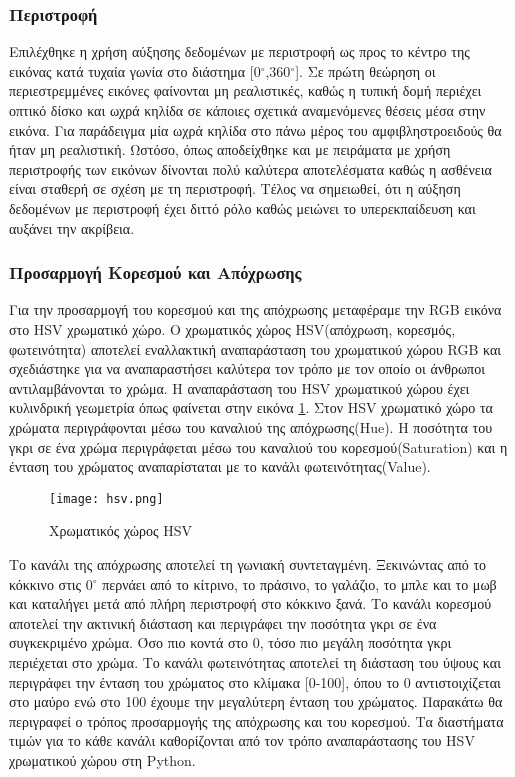 \subsubsection{Περιστροφή}
\label{subsubsec:5.1.2.1}


Επιλέχθηκε η χρήση αύξησης δεδομένων με περιστροφή ως προς το κέντρο της εικόνας κατά τυχαία γωνία στο διάστημα [0$^\circ$,360$^\circ$]. Σε πρώτη θεώρηση οι περιεστρεμμένες εικόνες φαίνονται μη ρεαλιστικές, καθώς η τυπική δομή περιέχει οπτικό δίσκο και ωχρά κηλίδα σε κάποιες σχετικά αναμενόμενες θέσεις  μέσα στην εικόνα. Για παράδειγμα μία ωχρά κηλίδα στο πάνω μέρος του αμφιβληστροειδούς θα ήταν μη ρεαλιστική. Ωστόσο, όπως αποδείχθηκε και με πειράματα με χρήση περιστροφής των εικόνων  δίνονται πολύ καλύτερα αποτελέσματα καθώς η ασθένεια είναι σταθερή σε σχέση με τη περιστροφή. Τέλος να σημειωθεί, ότι η αύξηση δεδομένων με περιστροφή έχει διττό ρόλο καθώς μειώνει το υπερεκπαίδευση και αυξάνει την ακρίβεια.



\subsubsection{Προσαρμογή Κορεσμού και Απόχρωσης}
\label{subsubsec:5.1.2.2}

Για την προσαρμογή του κορεσμού και της απόχρωσης μεταφέραμε την RGB εικόνα στο HSV χρωματικό χώρο\cite{HSV}. Ο χρωματικός χώρος HSV(απόχρωση, κορεσμός, φωτεινότητα) αποτελεί εναλλακτική αναπαράσταση του χρωματικού χώρου RGB και σχεδιάστηκε για να αναπαραστήσει καλύτερα  τον τρόπο με τον  οποίο οι άνθρωποι αντιλαμβάνονται το χρώμα. Η αναπαράσταση του HSV χρωματικού χώρου έχει κυλινδρική γεωμετρία όπως φαίνεται στην εικόνα \ref{figure:hsv}. Στον HSV χρωματικό χώρο τα χρώματα περιγράφονται μέσω του καναλιού της απόχρωσης(Hue). Η ποσότητα του γκρι σε ένα  χρώμα περιγράφεται μέσω του καναλιού του κορεσμού(Saturation) και η ένταση του χρώματος αναπαρίσταται με το κανάλι φωτεινότητας(Value).



\begin{figure}[!h]
    \centering
      \texttt{[image: hsv.png]} \caption{Χρωματικός χώρος HSV}
      \label{figure:hsv}    
  \end{figure}


Το κανάλι της απόχρωσης αποτελεί τη γωνιακή συντεταγμένη. Ξεκινώντας από το κόκκινο στις 0$^\circ$ περνάει από το κίτρινο, το πράσινο, το γαλάζιο, το μπλε και το μωβ και καταλήγει μετά από πλήρη περιστροφή στο κόκκινο ξανά. Το κανάλι κορεσμού αποτελεί την ακτινική διάσταση και περιγράφει την ποσότητα γκρι σε ένα συγκεκριμένο χρώμα. Όσο πιο κοντά στο 0, τόσο πιο μεγάλη ποσότητα γκρι περιέχεται στο χρώμα. Το κανάλι φωτεινότητας  αποτελεί τη διάσταση του ύψους και περιγράφει την ένταση του χρώματος στο κλίμακα [0-100], όπου το 0 αντιστοιχίζεται στο μαύρο ενώ στο 100 έχουμε την μεγαλύτερη ένταση του χρώματος. Παρακάτω θα περιγραφεί ο τρόπος προσαρμογής της απόχρωσης και του κορεσμού. Τα διαστήματα τιμών για το κάθε κανάλι καθορίζονται από τον τρόπο αναπαράστασης του HSV χρωματικού χώρου στη Python.

